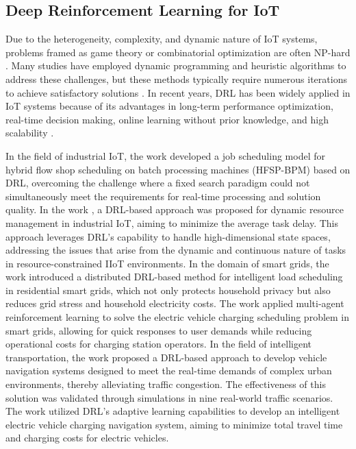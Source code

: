 \subsection{Deep Reinforcement Learning for IoT}
Due to the heterogeneity, complexity, and dynamic nature of IoT systems, problems framed as game theory or combinatorial optimization are often NP-hard \cite{uprety2020reinforcement}. Many studies have employed dynamic programming and heuristic algorithms to address these challenges, but these methods typically require numerous iterations to achieve satisfactory solutions \cite{huang2019deep}. In recent years, DRL has been widely applied in IoT systems because of its advantages in long-term performance optimization, real-time decision making, online learning without prior knowledge, and high scalability \cite{chen2021deep}.

In the field of industrial IoT, the work \cite{luo2023deep} developed a job scheduling model for hybrid flow shop scheduling on batch processing machines (HFSP-BPM) based on DRL, overcoming the challenge where a fixed search paradigm could not simultaneously meet the requirements for real-time processing and solution quality. In the work \cite{chen2020deep}, a DRL-based approach was proposed for dynamic resource management in industrial IoT, aiming to minimize the average task delay. This approach leverages DRL’s capability to handle high-dimensional state spaces, addressing the issues that arise from the dynamic and continuous nature of tasks in resource-constrained IIoT environments. In the domain of smart grids, the work \cite{chung2020distributed} introduced a distributed DRL-based method for intelligent load scheduling in residential smart grids, which not only protects household privacy but also reduces grid stress and household electricity costs. The work \cite{park2022multi} applied multi-agent reinforcement learning to solve the electric vehicle charging scheduling problem in smart grids, allowing for quick responses to user demands while reducing operational costs for charging station operators. In the field of intelligent transportation, the work \cite{koh2020real} proposed a DRL-based approach to develop vehicle navigation systems designed to meet the real-time demands of complex urban environments, thereby alleviating traffic congestion. The effectiveness of this solution was validated through simulations in nine real-world traffic scenarios. The work \cite{qian2019deep} utilized DRL’s adaptive learning capabilities to develop an intelligent electric vehicle charging navigation system, aiming to minimize total travel time and charging costs for electric vehicles.

